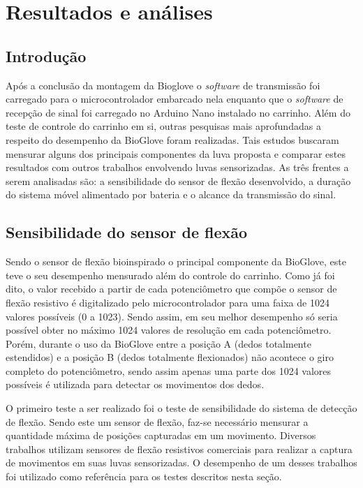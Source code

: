 \documentclass[
	12pt,				%
	openright,			%
	oneside,			%
	a4paper,			%
	english,			%
	brazil				%
	]{abntex2}
\begin{document}


\chapter{Resultados e análises}

		\section{Introdução}
		
		Após a conclusão da montagem da Bioglove o \textit{software} de transmissão foi carregado para o microcontrolador embarcado nela enquanto que o \textit{software} de recepção de sinal foi carregado no Arduino Nano instalado no carrinho. Além do teste de controle do carrinho em si, outras pesquisas mais aprofundadas a respeito do desempenho da BioGlove foram realizadas. Tais estudos buscaram mensurar alguns dos principais componentes da luva proposta e comparar estes resultados com outros trabalhos envolvendo luvas sensorizadas. As três frentes a serem analisadas são: a sensibilidade do sensor de flexão desenvolvido, a duração do sistema móvel alimentado por bateria e o alcance da transmissão do sinal.
		

		\section{Sensibilidade do sensor de flexão}

		Sendo o sensor de flexão bioinspirado o principal componente da BioGlove, este teve o seu desempenho mensurado além do controle do carrinho. Como já foi dito, o valor recebido a partir de cada potenciômetro que compõe o sensor de flexão resistivo é digitalizado pelo microcontrolador para uma faixa de 1024 valores possíveis (0 a 1023). Sendo assim, em seu melhor desempenho só seria possível obter no máximo 1024 valores de resolução em cada potenciômetro. Porém, durante o uso da BioGlove entre a posição A (dedos totalmente estendidos) e a posição B (dedos totalmente flexionados) não acontece o giro completo do potenciômetro, sendo assim apenas uma parte dos 1024 valores possíveis é utilizada para detectar os movimentos dos dedos.
		
		O primeiro teste a ser realizado foi o teste de sensibilidade do sistema de detecção de flexão. Sendo este um sensor de flexão, faz-se necessário mensurar a quantidade máxima de posições capturadas em um movimento. Diversos trabalhos utilizam sensores de flexão resistivos comerciais para realizar a captura de movimentos em suas luvas sensorizadas. O desempenho de um desses trabalhos foi utilizado como referência para os testes descritos nesta seção.
\end{document}
